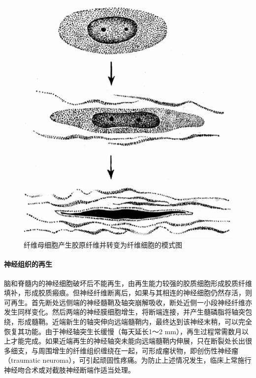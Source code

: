 \begin{figure}[!h]
	\begin{center}
		\includegraphics{./images/Image00025.jpg}
	\end{center}
	\captionsetup{justification=centering}
	\caption{纤维母细胞产生胶原纤维并转变为纤维细胞的模式图}
	\label{fig2-2}
\end{figure}

\paragraph{神经组织的再生}
脑和脊髓内的神经细胞破坏后不能再生，由再生能力较强的胶质细胞形成胶质纤维填补，形成胶质瘢痕。但神经纤维断离后，如果与其相连的神经细胞仍然存活，则可再生。首先断处远侧端的神经髓鞘及轴突崩解吸收，断处近侧一小段神经纤维亦发生同样变化。然后两端的神经膜细胞增生，将断端连接，并产生髓磷脂将轴突包绕，形成髓鞘。近端新生的轴突伸向远端髓鞘内，最终达到该神经末稍，可以完全恢复其功能。由于神经轴突生长缓慢（每天延长1～2
mm），再生过程常需数月以上才能完成。如果近端再生的神经轴突未能向远端髓鞘内伸展，只在断裂处长出很多细支，与周围增生的纤维组织缠绕在一起，可形成瘤状物，即创伤性神经瘤（traumatic
neuroma），可引起顽固性疼痛。为防止上述情况发生，临床上常施行神经吻合术或对截肢神经断端作适当处理。

